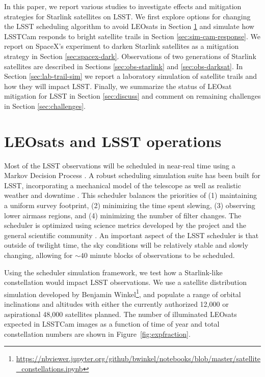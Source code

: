 \documentclass[twocolumn,trackchanges]{aastex63}
\begin{document}
In this paper, we report various studies to investigate effects and mitigation strategies for Starlink satellites on LSST. We first explore options for changing the LSST scheduling algorithm to avoid LEOsats in Section \ref{sec:leosat-survey} and simulate how LSSTCam responds to bright satellite trails in Section
\ref{sec:sim-cam-response}. We report on SpaceX's experiment to darken Starlink satellites as a mitigation strategy in Section \ref{sec:spacex-dark}. Observations of two generations of Starlink satellites are 
described in Sections \ref{sec:obs-starlink} and \ref{sec:obs-darksat}. In Section \ref{sec:lab-trail-sim} we report a laboratory simulation of satellite trails and how they will impact LSST. Finally, we summarize the status of LEOsat mitigation for LSST in Section \ref{sec:discuss} and comment on remaining challenges in Section \ref{sec:challenges}.


\section{LEOsats and LSST operations}
\label{sec:leosat-survey}

Most of the LSST observations will be scheduled in near-real time using a Markov Decision Process \citep{Naghib2019}. A robust scheduling simulation suite has been built for LSST, incorporating a mechanical model of the telescope as well as realistic weather and downtime \citep{Delgado06}. This scheduler balances the priorities of (1) maintaining a uniform survey footprint, (2) minimizing the time spent slewing, (3) observing lower airmass regions, and (4) minimizing the number of filter changes. The scheduler is optimized using science metrics developed by the project and the general scientific community \citep{Jones2014}. An important aspect of the LSST scheduler is that outside of twilight time, the sky conditions will be relatively stable and slowly changing, allowing for $\sim40$ minute blocks of observations to be scheduled.

Using the scheduler simulation framework, we test how a Starlink-like constellation would impact LSST observations.  We use a satellite distribution simulation developed by Benjamin Winkel\footnote{\url{https://nbviewer.jupyter.org/github/bwinkel/notebooks/blob/master/satellite_constellations.ipynb}}, and populate a range of orbital inclinations and altitudes with either the currently authorized 12,000 or aspirational 48,000 satellites planned.
The number of illuminated LEOsats expected in LSSTCam images as a function of time of year and total constellation numbers are shown in Figure~\ref{fig:expfraction}. 
\end{document}
